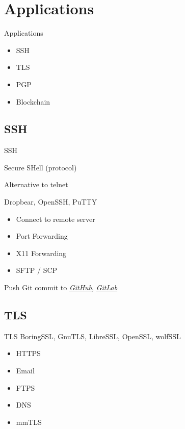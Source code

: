 \documentclass[UTF8]{ctexbeamer}
\begin{document}
\section{Applications}

\begin{frame}{Applications}
    \begin{itemize}
        \item SSH
        \item TLS
        \item PGP
        \item Blockchain
    \end{itemize}
\end{frame}

\subsection{SSH}
\begin{frame}{SSH}

    Secure SHell (protocol)
    
    \vspace{1em}
    
    Alternative to telnet
    
    Dropbear, OpenSSH, PuTTY
    
    \begin{itemize}
        \item Connect to remote server
        \item Port Forwarding
        \item X11 Forwarding
        \item SFTP / SCP
    \end{itemize}
    
    Push Git commit to \textit{\href{https://docs.github.com/en/github/authenticating-to-github/connecting-to-github-with-ssh}{GitHub}}, \textit{\href{https://docs.gitlab.com/ee/ssh/}{GitLab}}
\end{frame}

\subsection{TLS}
\begin{frame}{TLS}
    BoringSSL, GnuTLS, LibreSSL, OpenSSL, wolfSSL
    
    \vspace{1em}
    
    \begin{itemize}
        \item HTTPS
        \item Email
        \item FTPS
        \item DNS
        \item mmTLS
    \end{itemize}
\end{frame}
\end{document}

